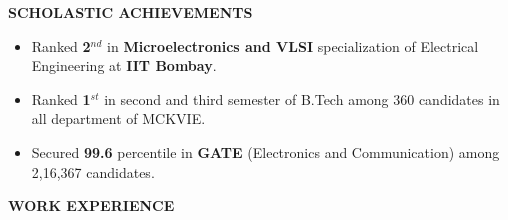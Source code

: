 \documentclass{article}
\begin{document}
  \begin{theorem}
   \vspace{-0.7mm}
\begin{center}
\textbf{  SCHOLASTIC ACHIEVEMENTS
}\end{center}  
\vspace{-0.7mm}    
   \end{theorem}
\vspace{-3mm}
\begin{itemize}
\setlength{\itemsep}{-0.10em}
\item Ranked \textbf{2$^{nd}$} in  \textbf{Microelectronics and VLSI} specialization of Electrical Engineering at \textbf{IIT Bombay}.

\item Ranked \textbf{1$^{st}$} in second and third semester of B.Tech among 360 candidates in all department of MCKVIE.
 
\item Secured \textbf{99.6} percentile in \textbf{GATE} (Electronics and Communication) among 2,16,367 candidates.
 
\end{itemize}
\vspace{-3mm}
\begin{theorem}
   \vspace{-0.7mm}
\begin{center}
\textbf{ WORK EXPERIENCE
}\end{center}  
\vspace{-0.7mm}    
   \end{theorem}
\vspace{-3mm}
\end{document}
